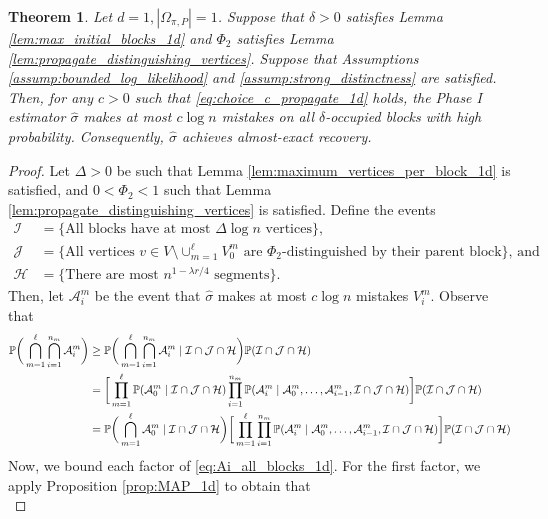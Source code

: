 \documentclass{article}
\renewcommand{\P}{\mathbb{P}}
\newcommand{\1}{\mathbbm{1}}
\newcommand{\calA}{\mathcal{A}}
\newcommand{\calH}{\mathcal{H}}
\newcommand{\calI}{\mathcal{I}}
\newcommand{\calJ}{\mathcal{J}}
\theoremstyle{definition}
\theoremstyle{plain}
\newtheorem{theorem}{Theorem}
\begin{document}
\begin{theorem}
Let $d = 1, |\Omega_{\pi, P}| = 1$. Suppose that $\delta > 0$ satisfies Lemma \ref{lem:max_initial_blocks_1d} and $\Phi_2$ satisfies Lemma \ref{lem:propagate_distinguishing_vertices}. Suppose that Assumptions \ref{assump:bounded_log_likelihood} and \ref{assump:strong_distinctness} are satisfied. Then, for any $c > 0$ such that \eqref{eq:choice_c_propagate_1d} holds, the Phase I estimator $\hat{\sigma}$ makes at most $c \log n$ mistakes on all $\delta$-occupied blocks with high probability. Consequently, $\hat{\sigma}$ achieves almost-exact recovery.
\end{theorem}
\begin{proof}
Let $\Delta > 0$ be such that Lemma \ref{lem:maximum_vertices_per_block_1d} is satisfied, and $0 < \Phi_2 < 1$ such that Lemma \ref{lem:propagate_distinguishing_vertices} is satisfied. Define the events 
\begin{align*}
    \calI &= \text{\{All blocks have at most $\Delta \log n$ vertices\}}, \\
    \calJ &= \text{\{All vertices $v \in V \setminus \cup_{m=1}^\ell V_0^m$ are $\Phi_2$-distinguished by their parent block\}, and} \\
    \calH &= \text{\{There are most $n^{1-\lambda r /4}$ segments\}}.
\end{align*}
Then, let $\calA_i^m$ be the event that $\hat{\sigma}$ makes at most $c \log n$ mistakes $V_{i}^m$. Observe that
\begin{align}
\label{eq:Ai_all_blocks_1d}
    \P\bigg(\bigcap_{m=1}^\ell \bigcap_{i=1}^{n_m} \calA_i^m\bigg) &\geq \P\bigg(\bigcap_{m=1}^\ell \bigcap_{i=1}^{n_m} \calA_i^m \mid \calI \cap \calJ \cap \calH\bigg) \P(\calI \cap \calJ \cap \calH) \notag \\
    &= \bigg[\prod_{m=1}^\ell \P(\calA_0^m \mid \calI \cap \calJ \cap \calH) \prod_{i=1}^{n_m} \P(\calA_i^m \mid \calA_0^m, \ldots, \calA_{i-1}^m, \calI \cap \calJ \cap \calH) \bigg] \P(\calI \cap \calJ \cap \calH) \notag \\
    &= \P\bigg(\bigcap_{m=1}^\ell \calA_0^m \mid \calI \cap \calJ \cap \calH\bigg) \bigg[ \prod_{m=1}^\ell\prod_{i=1}^{n_m} \P(\calA_i^m \mid \calA_0^m, \ldots, \calA_{i-1}^m, \calI \cap \calJ \cap \calH) \bigg] \P(\calI \cap \calJ \cap \calH)
\end{align}
Now, we bound each factor of \eqref{eq:Ai_all_blocks_1d}. For the first factor, we apply Proposition \ref{prop:MAP_1d} to obtain that
\begin{equation}
\label{eq:Ai_first_block_1d}

\end{equation}
\end{proof}
\end{document}
